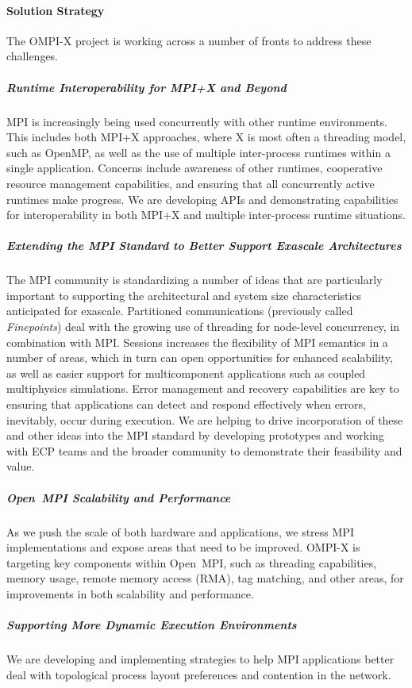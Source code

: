 \paragraph{Solution Strategy}
The OMPI-X project is working across a number of fronts to address
these challenges.

\subparagraph{Runtime Interoperability for MPI+X and Beyond} MPI is
increasingly being used concurrently with other runtime environments.
This includes both MPI+X approaches, where X
is most often a threading model, such as OpenMP, as
well as the use of multiple inter-process runtimes within a single
application.  Concerns include awareness of other runtimes,
cooperative resource management capabilities, and ensuring that all
concurrently active runtimes make progress.  We are developing APIs and
demonstrating capabilities for interoperability in both MPI+X and
multiple inter-process runtime situations.

\subparagraph{Extending the MPI Standard to Better Support Exascale
Architectures} The MPI community is standardizing a
number of ideas that
are particularly important to supporting
the architectural and system size characteristics anticipated for
exascale.  Partitioned communications (previously called \textit{Finepoints})
deal with the growing use of threading for node-level concurrency, in
combination with MPI.  Sessions increases the flexibility of MPI
semantics in a number of areas, which in turn can open opportunities
for enhanced scalability, as well as easier support for
multicomponent applications such as coupled multiphysics
simulations. Error management and recovery capabilities are key to
ensuring that applications can detect and respond effectively when errors,
inevitably, occur during execution.  We are helping to drive incorporation
of these and other ideas into the MPI standard by developing prototypes and
working with ECP teams and the broader community to demonstrate their
feasibility and value.

\subparagraph{Open~MPI Scalability and Performance} As we push the scale of
both hardware and applications, we stress MPI implementations and
expose areas that need to be improved.
OMPI-X is targeting key components within Open~MPI, such as threading capabilities,
memory usage, remote memory access (RMA), tag matching, and other areas,
for improvements in both scalability and performance.

\subparagraph{Supporting More Dynamic Execution Environments} We are
developing and implementing strategies to help MPI applications
better deal with topological process layout preferences
and contention in the network.

